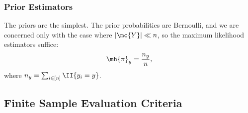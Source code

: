 \documentclass[10pt,journal,cspaper,compsoc]{IEEEtran}
\begin{document}




\subsubsection{Prior Estimators} %
\label{sub:prior_estimators}

The priors are the simplest.  The prior probabilities are Bernoulli, and we are concerned only with the case where $|\mc{Y}| \ll n$, so the maximum likelihood estimators suffice:
\begin{align}
\mh{\pi}_y = \frac{n_y}{n},
\end{align}
where $n_y=\sum_{i \in [n]} \II\{y_i = y\}$.



\subsection{Finite Sample Evaluation Criteria} %
\label{sub:evaluation_criteria}
\end{document}
